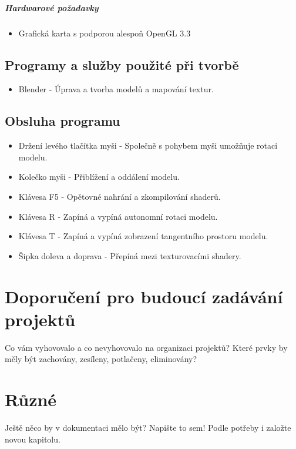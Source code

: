 \documentclass[12pt,a4paper,titlepage,final]{report}
\begin{document}
\paragraph{Hardwarové požadavky}
\begin{itemize}
	\item Grafická karta s podporou alespoň OpenGL 3.3
\end{itemize}

\section{Programy a služby použité při tvorbě}
\begin{itemize}
	\item Blender - Úprava a tvorba modelů a mapování textur.
\end{itemize}

\section{Obsluha programu}
\begin{itemize}
	\item Držení levého tlačítka myši - Společně s pohybem myši umožňuje rotaci modelu.
	\item Kolečko myši - Přiblížení a oddálení modelu.
	\item Klávesa F5 - Opětovné nahrání a zkompilování shaderů.
	\item Klávesa R - Zapíná a vypíná autonomní rotaci modelu.
	\item Klávesa T - Zapíná a vypíná zobrazení tangentního prostoru modelu.
	\item Šipka doleva a doprava - Přepíná mezi texturovacími shadery.
	
	
\end{itemize}

\chapter{Doporučení pro budoucí zadávání projektů}

Co vám vyhovovalo a co nevyhovovalo na organizaci projektů? Které prvky by měly být zachovány, zesíleny, potlačeny, eliminovány?


\chapter{Různé}

Ještě něco by v dokumentaci mělo být? Napište to sem! Podle potřeby i založte
novou kapitolu.




\nocite{cite1}
\nocite{cite2}
\nocite{cite3}
            

\end{document}

